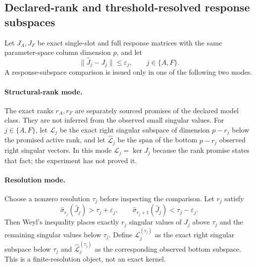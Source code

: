 \documentclass[aps,prl,reprint,superscriptaddress,nofootinbib]{revtex4-2}
\newcommand{\eps}{\varepsilon}
\begin{document}
\subsection{Declared-rank and threshold-resolved response subspaces}
\label{sec:resolved-subspaces}

Let $J_A,J_F$ be exact single-slot and full response matrices with the same parameter-space column dimension $p$, and let
\begin{equation}
 \|\widehat J_j-J_j\|\le\eps_j,
 \qquad j\in\{A,F\}.
 \label{eq:J-errors}
\end{equation}
A response-subspace comparison is issued only in one of the following two modes.

\paragraph{Structural-rank mode.}
The exact ranks $r_A,r_F$ are separately sourced promises of the declared model class.  They are not inferred from the observed small singular values.  For $j\in\{A,F\}$, let $\mathcal L_j$ be the exact right singular subspace of dimension $p-r_j$ below the promised active rank, and let $\widehat{\mathcal L}_j$ be the span of the bottom $p-r_j$ observed right singular vectors.  In this mode $\mathcal L_j=\ker J_j$ because the rank promise states that fact; the experiment has not proved it.

\paragraph{Resolution mode.}
Choose a nonzero resolution $\tau_j$ before inspecting the comparison.  Let $r_j$ satisfy
\begin{equation}
 \widehat\sigma_{r_j}(\widehat J_j)>\tau_j+\eps_j,
 \qquad
 \widehat\sigma_{r_j+1}(\widehat J_j)<\tau_j-\eps_j.
 \label{eq:threshold-band}
\end{equation}
Then Weyl's inequality places exactly $r_j$ singular values of $J_j$ above $\tau_j$ and the remaining singular values below $\tau_j$.  Define $\mathcal L_j^{(\tau_j)}$ as the exact right singular subspace below $\tau_j$ and $\widehat{\mathcal L}_j^{(\tau_j)}$ as the corresponding observed bottom subspace.  This is a finite-resolution object, not an exact kernel.
\end{document}
